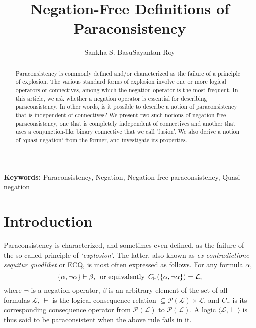 \documentclass[submission]{eptcs}
\title{Negation-Free Definitions of Paraconsistency}
\author{Sankha S. Basu\qquad\qquad Sayantan Roy
  \institute{Department of Mathematics\\
  Indraprastha Institute of Information Technology-Delhi\\
  New Delhi, India.}
  \email{sankha@iiitd.ac.in \qquad\qquad sayantanr@iiitd.ac.in}
  }
\newcommand{\lang}{\mathcal{L}}
\newcommand{\pow}{\mathcal{P}}
\theoremstyle{definition}
\begin{document}
\maketitle

\begin{abstract}
    \noindent Paraconsistency is commonly defined and/or characterized as the failure of a principle of explosion. The various standard forms of explosion involve one or more logical operators or connectives, among which the negation operator is the most frequent. In this article, we ask whether a negation operator is essential for describing paraconsistency. In other words, is it possible to describe a notion of paraconsistency that is independent of connectives? We present two such notions of negation-free paraconsistency, one that is completely independent of connectives and another that uses a conjunction-like binary connective that we call `fusion'. We also derive a notion of `quasi-negation' from the former, and investigate its properties.
\end{abstract}
\textbf{Keywords:}
Paraconsistency, Negation, Negation-free paraconsistency, Quasi-negation


\section{Introduction}

Paraconsistency is characterized, and sometimes even defined, as the failure of the so-called principle of \emph{`explosion'}. The latter, also known as \emph{ex contradictione sequitur quodlibet} or ECQ, is most often expressed as follows. For any formula $\alpha$,
\[
\{\alpha,\neg\alpha\}\vdash\beta,\,\hbox{ or equivalently }\, C_\vdash(\{\alpha,\neg\alpha\})=\lang,
\]
where $\neg$ is a negation operator, $\beta$ is an arbitrary element of the set of all formulas $\lang$, $\vdash$ is the logical consequence relation $\subseteq\pow(\lang)\times\lang$, and $C_\vdash$ is its corresponding consequence operator from $\pow(\lang)$ to $\pow(\lang)$. A logic $\langle\lang,\vdash\rangle$ is thus said to be paraconsistent when the above rule fails in it. 
\end{document}

